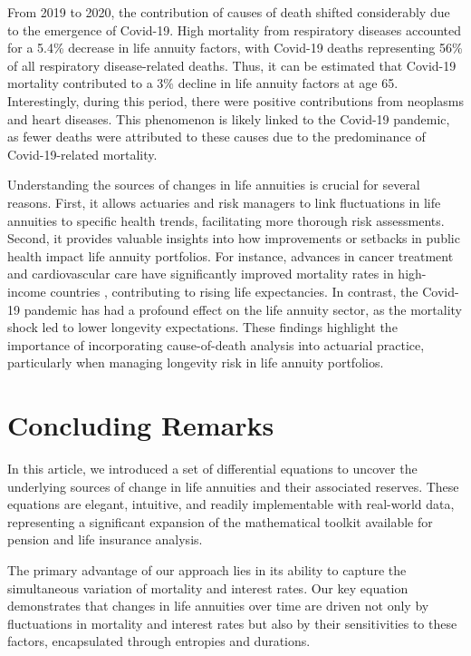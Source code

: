 \documentclass[12pt]{article}
\begin{document}
{From 2019 to 2020, the contribution of causes of death shifted considerably due to the emergence of Covid-19. High mortality from respiratory diseases accounted for a 5.4\% decrease in life annuity factors, with Covid-19 deaths representing 56\% of all respiratory disease-related deaths. Thus, it can be estimated that Covid-19 mortality contributed to a 3\% decline in life annuity factors at age 65. Interestingly, during this period, there were positive contributions from neoplasms and heart diseases. This phenomenon is likely linked to the Covid-19 pandemic, as fewer deaths were attributed to these causes due to the predominance of Covid-19-related mortality.

Understanding the sources of changes in life annuities is crucial for several reasons. First, it allows actuaries and risk managers to link fluctuations in life annuities to specific health trends, facilitating more thorough risk assessments. Second, it provides valuable insights into how improvements or setbacks in public health impact life annuity portfolios. For instance, advances in cancer treatment and cardiovascular care have significantly improved mortality rates in high-income countries \citep{weber2023gains}, contributing to rising life expectancies. In contrast, the Covid-19 pandemic has had a profound effect on the life annuity sector, as the mortality shock led to lower longevity expectations. These findings highlight the importance of incorporating cause-of-death analysis into actuarial practice, particularly when managing longevity risk in life annuity portfolios.

\section{Concluding Remarks}\label{sec:6_Conclusion}

In this article, we introduced a set of differential equations to uncover the underlying sources of change in life annuities and their associated reserves. These equations are elegant, intuitive, and readily implementable with real-world data, representing a significant expansion of the mathematical toolkit available for pension and life insurance analysis.

The primary advantage of our approach lies in its ability to capture the simultaneous variation of mortality and interest rates. Our key equation demonstrates that changes in life annuities over time are driven not only by fluctuations in mortality and interest rates but also by their sensitivities to these factors, encapsulated through entropies and durations.

}
\end{document}
